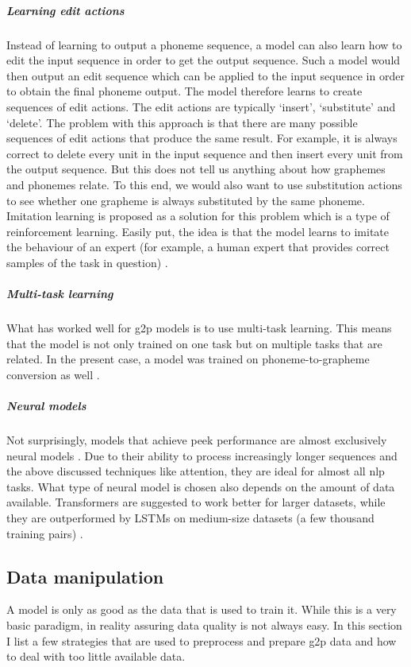 \subparagraph{Learning edit actions}
Instead of learning to output a phoneme sequence, a model can also learn how to edit the input sequence in order to get the output sequence. Such a model would then output an edit sequence which can be applied to the input sequence in order to obtain the final phoneme output. The model therefore learns to create sequences of edit actions. The edit actions are typically `insert', `substitute' and `delete'. The problem with this approach is that there are many possible sequences of edit actions that produce the same result. For example, it is always correct to delete every unit in the input sequence and then insert every unit from the output sequence. But this does not tell us anything about how graphemes and phonemes relate. To this end, we would also want to use substitution actions to see whether one grapheme is always substituted by the same phoneme. Imitation learning is proposed as a solution for this problem which is a type of reinforcement learning. Easily put, the idea is that the model learns to imitate the behaviour of an expert (for example, a human expert that provides correct samples of the task in question) \citep{Ai.2019}. 

\subparagraph{Multi-task learning}
What has worked well for \ac{g2p} models is to use multi-task learning. This means that the model is not only trained on one task but on multiple tasks that are related. In the present case, a model was trained on phoneme-to-grapheme conversion as well \citep{gorman-etal-2020-sigmorphon}.

\subparagraph{Neural models}
Not surprisingly, models that achieve peek performance are almost exclusively neural models \citep{gorman-etal-2020-sigmorphon}. Due to their ability to process increasingly longer sequences and the above discussed techniques like attention, they are ideal for almost all \ac{nlp} tasks. What type of neural model is chosen also depends on the amount of data available. Transformers are suggested to work better for larger datasets, while they are outperformed by LSTMs on medium-size datasets (a few thousand training pairs) \citep{gorman-etal-2020-sigmorphon}.

\subsection{Data manipulation}
A model is only as good as the data that is used to train it. While this is a very basic paradigm, in reality assuring data quality is not always easy. In this section I list a few strategies that are used to preprocess and prepare \ac{g2p} data and how to deal with too little available data. 

